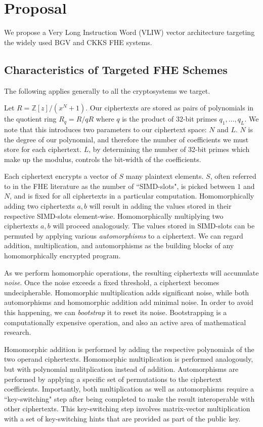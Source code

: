 \section{Proposal}

We propose a Very Long Instruction Word (VLIW) vector architecture targeting
the widely used BGV \cite{brakerski:itcs12:bgv} and CKKS \cite{cheon:asiacrypt2017:ckks}
FHE systems.

\subsection{Characteristics of Targeted FHE Schemes}

The following applies generally to all the cryptosystems we target.

Let $R = \mathbb{Z}[z]/(x^N+1)$. Our ciphertexts are stored as pairs of
polynomials in the quotient ring $R_q = R /qR$ where $q$ is the product of
32-bit primes $q_1, \dots, q_L$. We note that this introduces two parameters
to our ciphertext space: $N$ and $L$. $N$ is the degree of our polynomial, 
and therefore the number of coefficients we must store for each ciphertext.
$L$, by determining the number of 32-bit primes which make up the modulus,
controls the bit-width of the coefficients.

Each ciphertext encrypts a vector of $S$ many plaintext elements.
$S$, often referred to in the FHE literature as the number of ``SIMD-slots",
is picked between $1$ and $N$, and is fixed for all ciphertexts in a particular
computation. 
Homomorphically adding two ciphertexts $a, b$ will result in adding the
values stored in their respective SIMD-slots element-wise.
Homomorphically multiplying two ciphertexts $a, b$ will proceed analogously.
The values stored in SIMD-slots can be permuted by applying various
\emph{automorphisms} to a ciphertext. We can regard addition, multiplication,
and automorphisms as the building blocks of any homomorphically encrypted
program.

As we perform homomorphic operations, the resulting ciphertexts will accumulate
\emph{noise}. Once the noise exceeds a fixed threshold, a ciphertext becomes
undecipherable. Homomorphic multiplication adds significant noise, while both
automorphisms and homomorphic addition add minimal noise.
In order to avoid this happening, we can \emph{bootstrap} it to reset its noise.
Bootstrapping is a computationally expensive operation, and also an active area
of mathematical research.

Homomorphic addition is performed by adding the respective polynomials of the
two operand ciphertexts. Homomorphic multiplication is performed analogously,
but with polynomial mulitplication instead of addition. Automorphisms are
performed by applying a specific set of permutations to the ciphertext
coefficients. Importantly, both multiplication as well as automorphisms
require a ``key-switching" step after being completed to make the result
interoperable with other ciphertexts. This key-switching step involves
matrix-vector multiplication with a set of key-switching hints that are provided
as part of the public key.

